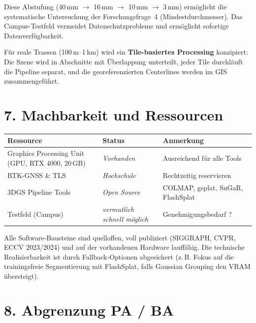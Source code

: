 \documentclass[11pt, a4paper]{article}
\begin{document}
Diese Abstufung (40\,mm $\rightarrow$ 16\,mm $\rightarrow$ 10\,mm $\rightarrow$ 3\,mm) erm\"oglicht die systematische Untersuchung der Forschungsfrage~4 (Mindestdurchmesser). Das Campus-Testfeld vermeidet Datenschutzprobleme und erm\"oglicht sofortige Datenverf\"ugbarkeit.

F\"ur reale Trassen (100\,m--1\,km) wird ein \textbf{Tile-basiertes Processing} konzipiert: Die Szene wird in Abschnitte mit \"Uberlappung unterteilt, jeder Tile durchl\"auft die Pipeline separat, und die georeferenzierten Centerlines werden im GIS zusammengef\"uhrt.

\section{7. Machbarkeit und Ressourcen}

\begin{center}
    \small
    \begin{tabular}{p{6.5cm} l p{5.5cm}}
        \toprule
        \textbf{Ressource}                               & \textbf{Status}                       & \textbf{Anmerkung}                \\
        \midrule
        Graphics Processing Unit (GPU, RTX 4000, 20\,GB) & \textit{Vorhanden}                    & Ausreichend f\"ur alle Tools      \\
        RTK-GNSS \& TLS                                  & \textit{Hochschule}                   & Rechtzeitig reservieren           \\
        3DGS Pipeline Tools                              & \textit{Open Source}                  & COLMAP, gsplat, SuGaR, FlashSplat \\
        Testfeld (Campus)                                & \textit{vermutlich schnell m\"oglich} & Genehmigungsbedarf ?              \\
        \bottomrule
    \end{tabular}
\end{center}

Alle Software-Bausteine sind quelloffen, voll publiziert (SIGGRAPH, CVPR, ECCV 2023/2024) und auf der vorhandenen Hardware lauff\"ahig. Die technische Realisierbarkeit ist durch Fallback-Optionen abgesichert (z.\,B. Fokus auf die trainingsfreie Segmentierung mit FlashSplat, falls Gaussian Grouping den VRAM \"ubersteigt).

\section{8. Abgrenzung PA / BA}
\end{document}
